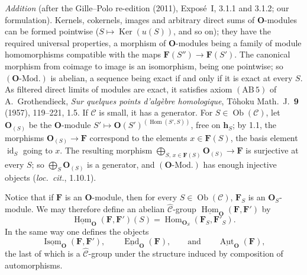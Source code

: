 \par\medskip\noindent{}%
\emph{Addition} (after the Gille--Polo re-edition (2011), Exposé~I, 3.1.1
and 3.1.2; our formulation). Kernels, cokernels, images and arbitrary
direct sums of \(\mathbf O\)-modules can be formed pointwise
(\(S\mapsto\operatorname{Ker}(u(S))\), and so on); they have the required
universal properties, a morphism of \(\mathbf O\)-modules being a family of
module homomorphisms compatible with the maps
\(\mathbf F(S'')\to\mathbf F(S')\). The canonical morphism from coimage to
image is an isomorphism, being one pointwise; so
\((\mathbf O\text{-Mod.})\) is abelian, a sequence being exact if and only
if it is exact at every \(S\). As filtered direct limits of modules are
exact, it satisfies axiom \((\mathrm{AB}\,5)\) of A.~Grothendieck, \textit{Sur quelques points d'algèbre homologique}, Tôhoku Math.\ J.\ \textbf{9} (1957), 119--221, 1.5. If
\(\mathscr C\) is small, it has a generator. For
\(S\in\operatorname{Ob}(\mathscr C)\), let \(\mathbf O_{(S)}\) be the
\(\mathbf O\)-module \(S'\mapsto\mathbf O(S')^{(\operatorname{Hom}(S',S))}\),
free on \(\mathbf h_S\); by 1.1, the morphisms
\(\mathbf O_{(S)}\to\mathbf F\) correspond to the elements
\(x\in\mathbf F(S)\), the basis element \(\operatorname{id}_S\) going to
\(x\). The resulting morphism
\(\bigoplus_{S,\,x\in\mathbf F(S)}\mathbf O_{(S)}\to\mathbf F\) is surjective
at every \(S\); so \(\bigoplus_S\mathbf O_{(S)}\) is a generator, and
\((\mathbf O\text{-Mod.})\) has enough injective objects
(\textit{loc.\ cit.}, 1.10.1).
\par\medskip

\medskip
\noindent{}Notice that if \(\mathbf F\) is an \(\mathbf O\)-module, then for every
\(S\in\operatorname{Ob}(\mathscr C)\), \(\mathbf F_S\) is an
\(\mathbf O_S\)-module. We may therefore define an abelian
\(\widehat{\mathscr C}\)-group
\(\underline{\operatorname{Hom}}_{\mathbf O}(\mathbf F,\mathbf F')\) by
\[
  \underline{\operatorname{Hom}}_{\mathbf O}(\mathbf F,\mathbf F')(S)
    =\operatorname{Hom}_{\mathbf O_S}(\mathbf F_S,\mathbf F'_S).
\]
In the same way one defines the objects
\[
  \underline{\operatorname{Isom}}_{\mathbf O}(\mathbf F,\mathbf F'),
  \qquad
  \underline{\operatorname{End}}_{\mathbf O}(\mathbf F),
  \qquad\text{and}\qquad
  \underline{\operatorname{Aut}}_{\mathbf O}(\mathbf F),
\]
the last of which is a \(\widehat{\mathscr C}\)-group under the structure
induced by composition of automorphisms.

